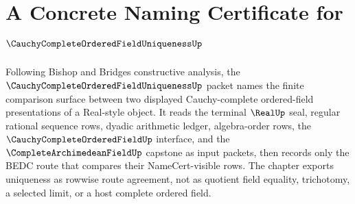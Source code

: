 \chapter{A Concrete Naming Certificate for $\CauchyCompleteOrderedFieldUniquenessUp$}
\label{ch:concrete-instances-cauchy-complete-ordered-field-uniqueness-namecert}

Following Bishop and Bridges constructive analysis, the $\CauchyCompleteOrderedFieldUniquenessUp$ packet names the finite comparison surface between two displayed Cauchy-complete ordered-field presentations of a Real-style object. It reads the terminal $\RealUp$ seal, regular rational sequence rows, dyadic arithmetic ledger, algebra-order rows, the $\CauchyCompleteOrderedFieldUp$ interface, and the $\CompleteArchimedeanFieldUp$ capstone as input packets, then records only the BEDC route that compares their NameCert-visible rows. The chapter exports uniqueness as rowwise route agreement, not as quotient field equality, trichotomy, a selected limit, or a host complete ordered field.


